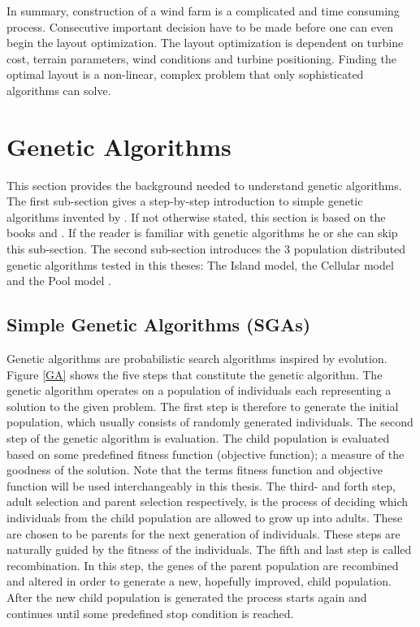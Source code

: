 \noindent In summary, construction of a wind farm is a complicated and time consuming process. Consecutive important decision have to be made before one can even begin the layout optimization. The layout optimization is dependent on turbine cost, terrain parameters, wind conditions and turbine positioning. Finding the optimal layout is a non-linear, complex problem that only sophisticated algorithms can solve.


\section{Genetic Algorithms}\label{section:ga}
This section provides the background needed to understand genetic algorithms. The first sub-section gives a step-by-step introduction to simple genetic algorithms invented by \cite{Holland}. If not otherwise stated, this section is based on the books \cite{Holland} and \cite{Goldberg}. If the reader is familiar with genetic algorithms he or she can skip this sub-section. The second sub-section introduces the 3 population distributed genetic algorithms tested in this theses: The Island model, the Cellular model and the Pool model \citep{Gong}.\\


\subsection{Simple Genetic Algorithms (SGAs)}\label{subsection:sga}
Genetic algorithms are probabilistic search algorithms inspired by evolution. Figure \ref{GA} shows the five steps that constitute the genetic algorithm. The genetic algorithm operates on a population of individuals each representing a solution to the given problem. The first step is therefore to generate the initial population, which usually consists of randomly generated individuals. The second step of the genetic algorithm is evaluation. The child population is evaluated based on some predefined fitness function (objective function); a measure of the goodness of the solution. Note that the terms fitness function and objective function will be used interchangeably in this thesis. The third- and forth step, adult selection and parent selection respectively, is the process of deciding which individuals from the child population are allowed to grow up into adults. These are chosen to be parents for the next generation of individuals. These steps are naturally guided by the fitness of the individuals. The fifth and last step is called recombination. In this step, the genes of the parent population are recombined and altered in order to generate a new, hopefully improved, child population. After the new child population is generated the process starts again and continues until some predefined stop condition is reached. \\


